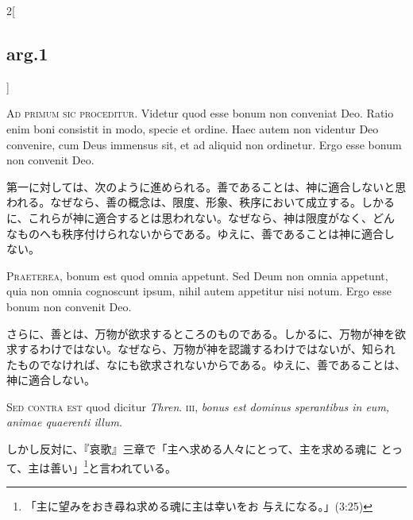 \documentclass[paper=a4paper,fontsize=10pt,jafontsize=9pt,titlepage]{jlreq}
\begin{document}
\begin{paracol}{2}[\subsection{arg.1}]

{\huge A}{\scshape d primum sic proceditur}. Videtur quod esse bonum non
 conveniat Deo. Ratio enim boni consistit in modo, specie et
 ordine. Haec autem non videntur Deo convenire, cum Deus immensus sit,
 et ad aliquid non ordinetur. Ergo esse bonum non convenit Deo.

\switchcolumn

第一に対しては、次のように進められる。善であることは、神に適合しないと思
 われる。なぜなら、善の概念は、限度、形象、秩序において成立する。しかる
 に、これらが神に適合するとは思われない。なぜなら、神は限度がなく、どん
 なものへも秩序付けられないからである。ゆえに、善であることは神に適合し
 ない。


{\scshape Praeterea}, bonum est quod omnia appetunt. Sed Deum non omnia
 appetunt, quia non omnia cognoscunt ipsum, nihil autem appetitur nisi
 notum. Ergo esse bonum non convenit Deo.

\switchcolumn

さらに、善とは、万物が欲求するところのものである。しかるに、万物が神を欲
 求するわけではない。なぜなら、万物が神を認識するわけではないが、知られ
 たものでなければ、なにも欲求されないからである。ゆえに、善であることは、
 神に適合しない。

\switchcolumn*[\subsection{s.c.}]

{\scshape Sed contra est} quod dicitur {\itshape Thren}. {\scshape iii},
 {\itshape bonus est dominus sperantibus in eum, animae quaerenti
 illum}.

\switchcolumn

しかし反対に、『哀歌』三章で「主へ求める人々にとって、主を求める魂に
 とって、主は善い」\footnote{「主に望みをおき尋ね求める魂に主は幸いをお
 与えになる。」(3:25)}と言われている。



\end{paracol}
\end{document}
